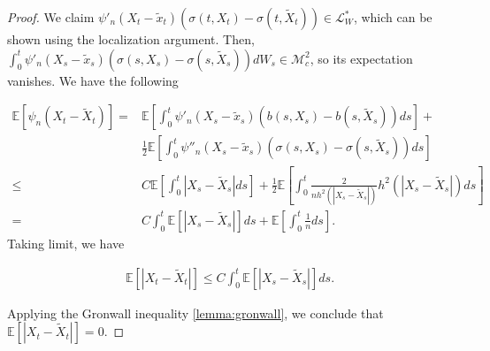 \documentclass{article}
\begin{document}
\begin{proof}
We claim $\psi'_n(X_t-\tilde{x}_t)(\sigma(t,X_t)-\sigma(t,\tilde{X}_t))\in\mathcal{L}^*_W$, which can be shown using the localization argument. Then, $\int_0^t\psi'_n(X_s-\tilde{x}_s)(\sigma(s,X_s)-\sigma(s,\tilde{X}_s))dW_s\in\mathcal{M}_c^2$, so its expectation vanishes. We have the following

\begin{equation*}
\begin{aligned}
\mathbb{E}[\psi_n(X_t-\tilde{X}_t)]=&\mathbb{E}[\int^t_0\psi'_n(X_s-\tilde{x}_s)(b(s,X_s)-b(s,\tilde{X}_s))ds]+\\
&\frac{1}{2}\mathbb{E}[\int^t_0\psi''_n(X_s-\tilde{x}_s)(\sigma(s,X_s)-\sigma(s,\tilde{X}_s))ds]\\
\leq&C\mathbb{E}[\int^t_0|X_s-\tilde{X}_s|ds]+\frac{1}{2}\mathbb{E}[\int^t_0\frac{2}{nh^2(|X_s-\tilde{X}_s|)}h^2(|X_s-\tilde{X}_s|)ds]\\
=&C\int^t_0\mathbb{E}[|X_s-\tilde{X}_s|]ds+\mathbb{E}[\int^t_0\frac{1}{n}ds].
\end{aligned}
\end{equation*}
Taking limit, we have

\begin{equation*}
\begin{aligned}
\mathbb{E}[|X_t-\tilde{X}_t|]\leq C\int^t_0\mathbb{E}[|X_s-\tilde{X}_s|]ds.
\end{aligned}
\end{equation*}

Applying the Gronwall inequality \eqref{lemma:gronwall}, we conclude that $\mathbb{E}[|X_t-\tilde{X}_t|]=0$.

\end{proof}
\end{document}
